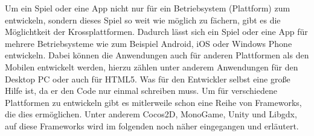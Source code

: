 Um ein Spiel oder eine App nicht nur für ein Betriebsystem (Plattform) zum entwickeln, sondern dieses Spiel so weit
wie möglich zu fächern, gibt es die Möglichtkeit der Krossplattformen.
Dadurch lässt sich ein Spiel oder eine App für mehrere Betriebsysteme wie zum Beispiel Android, iOS oder Windows Phone
entwickeln. Dabei können die Anwendungen auch für anderen Plattformen
als den Mobilen entwickelt werden, hierzu zählen unter anderem Anwendungen für den Desktop PC 
oder auch für HTML5. Was für den Entwickler selbst eine große Hilfe ist, da er den Code nur einmal
schreiben muss.
Um für verschiedene Plattformen zu entwickeln gibt es mitlerweile schon eine Reihe von Frameworks,
die dies ermöglichen. Unter anderem Cocos2D, MonoGame, Unity und Libgdx, auf diese Frameworks wird im 
folgenden noch näher eingegangen und erläutert.